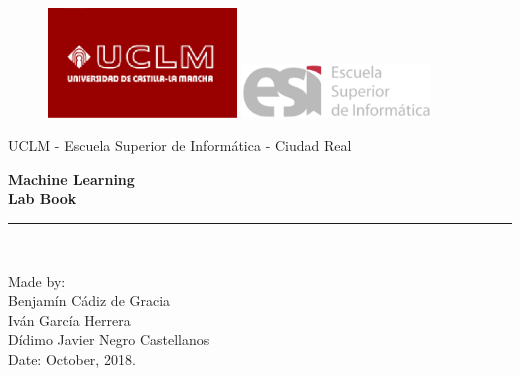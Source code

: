 \begin{titlepage}
\begin{center}
\vspace*{-1in}
\begin{figure}[htb]
\begin{center}
\includegraphics[width=5cm]{./images/uclm_logo.eps} 
\hspace*{1.5in}
\includegraphics[width=5cm]{./images/esi_logo.eps}
\end{center}
\end{figure}
\end{center}
\begin{center}
UCLM - Escuela Superior de Informática - Ciudad Real\\
\vspace*{0.6in}
\vspace*{0.2in}
\begin{Large}
\textbf{Machine Learning} \\
\textbf{Lab Book} \\
\end{Large}
\vspace*{0.3in}
\vspace*{0.3in}
\rule{80mm}{0.1mm}\\
\vspace*{0.1in}
\begin{large}
Made by: \\
Benjamín Cádiz de Gracia \\
Iván García Herrera \\
Dídimo Javier Negro Castellanos \\
\vspace*{0.3in}
Date: October, 2018.\\
\end{large}
\end{center}

\end{titlepage}
